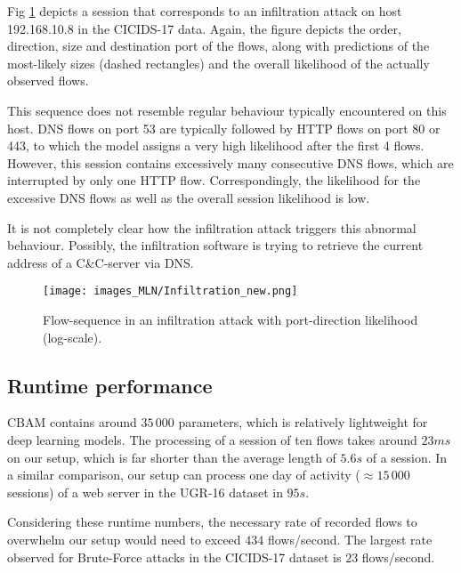 Fig \ref{figF:Infiltration} depicts a session that corresponds to an infiltration attack on host 192.168.10.8 in the CICIDS-17 data. Again, the figure depicts the order, direction, size and destination port of the flows, along with predictions of the most-likely sizes (dashed rectangles) and the overall likelihood of the actually observed flows.

This sequence does not resemble regular behaviour typically encountered on this host. DNS flows on port 53 are typically followed by HTTP flows on port 80 or 443, to which the model assigns a very high likelihood after the first 4 flows. However, this session contains excessively many consecutive DNS flows, which are interrupted by only one HTTP flow. Correspondingly, the likelihood for the excessive DNS flows as well as the overall session likelihood is low. 

It is not completely clear how the infiltration attack triggers this abnormal behaviour. Possibly, the infiltration software is trying to retrieve the current address of a C\&C-server via DNS.

\begin{figure}[ht]
    \begin{center}
      \texttt{[image: images\_MLN/Infiltration\_new.png]}
    \end{center}

    \caption{Flow-sequence in an infiltration attack with port-direction likelihood (log-scale).}\label{figF:Infiltration}
\end{figure}

\subsection{Runtime performance}

CBAM contains around $35\,000$ parameters, which is relatively lightweight for deep learning models. The processing of a session of ten flows takes around $23ms$ on our setup, which is far shorter than the average length of $5.6s$ of a session. In a similar comparison, our setup can process one day of activity ($\approx 15\,000$ sessions) of a web server in the UGR-16 dataset in $95s$.

Considering these runtime numbers, the necessary rate of recorded flows to overwhelm our setup would need to exceed $434$ flows/second. The largest rate observed for Brute-Force attacks in the CICIDS-17 dataset is $23$ flows/second. 





